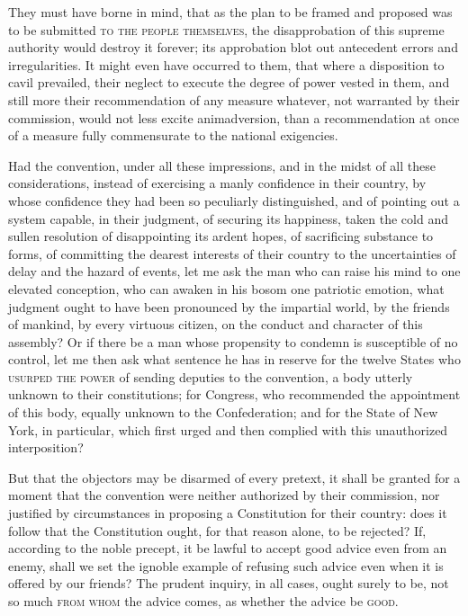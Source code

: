 They must have borne in mind, that as the plan to be framed and proposed was to be submitted \textsc{to the people themselves}, the disapprobation of this supreme authority would destroy it forever; its approbation blot out antecedent errors and irregularities. 
It might even have occurred to them, that where a disposition to cavil prevailed, their neglect to execute the degree of power vested in them, and still more their recommendation of any measure whatever, not warranted by their commission, would not less excite animadversion, than a recommendation at once of a measure fully commensurate to the national exigencies.

Had the convention, under all these impressions, and in the midst of all these considerations, instead of exercising a manly confidence in their country, by whose confidence they had been so peculiarly distinguished, and of pointing out a system capable, in their judgment, of securing its happiness, taken the cold and sullen resolution of disappointing its ardent hopes, of sacrificing substance to forms, of committing the dearest interests of their country to the uncertainties of delay and the hazard of events, let me ask the man who can raise his mind to one elevated conception, who can awaken in his bosom one patriotic emotion, what judgment ought to have been pronounced by the impartial world, by the friends of mankind, by every virtuous citizen, on the conduct and character of this assembly? 
Or if there be a man whose propensity to condemn is susceptible of no control, let me then ask what sentence he has in reserve for the twelve States who \textsc{usurped the power} of sending deputies to the convention, a body utterly unknown to their constitutions; for Congress, who recommended the appointment of this body, equally unknown to the Confederation; and for the State of New York, in particular, which first urged and then complied with this unauthorized interposition?

But that the objectors may be disarmed of every pretext, it shall be granted for a moment that the convention were neither authorized by their commission, nor justified by circumstances in proposing a Constitution for their country: does it follow that the Constitution ought, for that reason alone, to be rejected? 
If, according to the noble precept, it be lawful to accept good advice even from an enemy, shall we set the ignoble example of refusing such advice even when it is offered by our friends? 
The prudent inquiry, in all cases, ought surely to be, not so much \textsc{from whom} the advice comes, as whether the advice be \textsc{good}.

